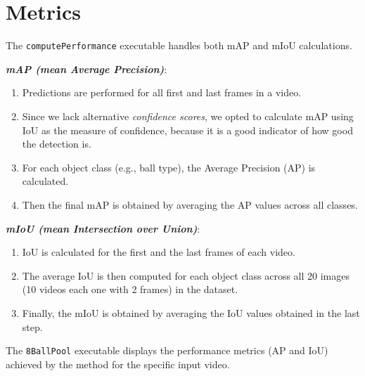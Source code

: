 \section{Metrics}
The \texttt{computePerformance} executable handles both mAP and mIoU calculations.

\noindent\textbf{\emph{mAP (mean Average Precision)}}:
\begin{enumerate}
	\item Predictions are performed for all first and last frames in a video.
	\item Since we lack alternative \textit{confidence scores}, we opted to calculate mAP using IoU as the measure of confidence, because it is a good indicator of how good the detection is.
	\item For each object class (e.g., ball type), the Average Precision (AP) is calculated.
	\item Then the final mAP is obtained by averaging the AP values across all classes.
\end{enumerate}

\noindent\textbf{\emph{mIoU (mean Intersection over Union)}}:
\begin{enumerate}
	\item IoU is calculated for the first and the last frames of each video.
	\item The average IoU is then computed for each object class across all 20 images (10 videos each one with 2 frames) in the dataset.
	\item Finally, the mIoU is obtained by averaging the IoU values obtained in the last step.
\end{enumerate}

The \texttt{8BallPool} executable displays the performance metrics (AP and IoU) achieved by the method for the specific input video.

